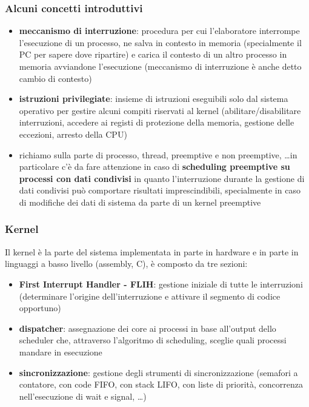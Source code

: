 \documentclass[a4paper]{article}
\begin{document}
\subsubsection*{Alcuni concetti introduttivi}
\begin{itemize}
	\item \textbf{meccanismo di interruzione}: procedura per cui l'elaboratore interrompe l'esecuzione di un processo, ne salva
	in contesto in memoria (specialmente il PC per sapere dove ripartire) e carica il contesto di un altro processo in memoria
	avviandone l'esecuzione (meccanismo di interruzione è anche detto cambio di contesto)
	\item \textbf{istruzioni privilegiate}: insieme di istruzioni eseguibili solo dal sistema operativo per gestire alcuni compiti
	riservati al kernel (abilitare/disabilitare interruzioni, accedere ai registi di protezione della memoria, gestione delle
	eccezioni, arresto della CPU)
	\item richiamo sulla parte di processo, thread, preemptive e non preemptive, \dots in particolare c'è da fare attenzione in
	caso di \textbf{scheduling preemptive su processi con dati condivisi} in quanto l'interruzione durante la gestione di dati
	condivisi può comportare risultati imprescindibili, specialmente in caso di modifiche dei dati di sistema da parte di un
	kernel preemptive
\end{itemize}

\subsubsection*{Kernel}
Il kernel è la parte del sistema implementata in parte in hardware e in parte in linguaggi a basso livello (assembly, C), è
composto da tre sezioni:
\begin{itemize}
	\item \textbf{First Interrupt Handler - FLIH}: gestione iniziale di tutte le interruzioni (determinare l'origine dell'interruzione
	e attivare il segmento di codice opportuno)
	\item \textbf{dispatcher}: assegnazione dei core ai processi in base all'output dello scheduler che, attraverso l'algoritmo
	di scheduling, sceglie quali processi mandare in esecuzione
	\item \textbf{sincronizzazione}: gestione degli strumenti di sincronizzazione (semafori a contatore, con code FIFO, con stack
	LIFO, con liste di priorità, concorrenza nell'esecuzione di wait e signal, \dots)
\end{itemize}
\end{document}
